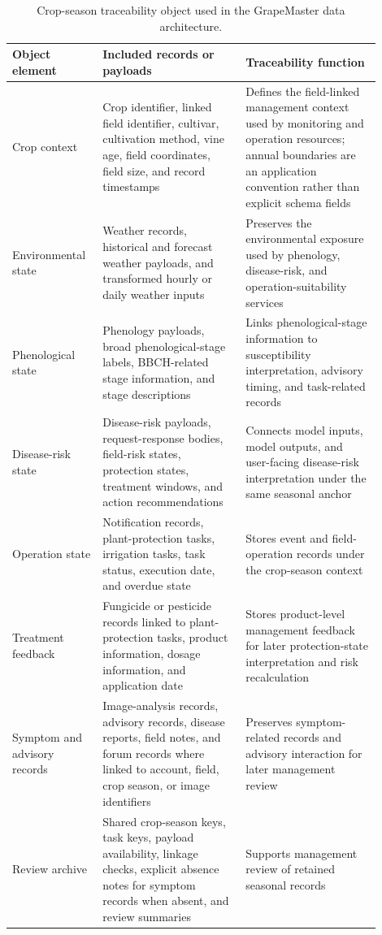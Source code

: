 \documentclass[12pt]{article}
\newcommand{\tablefontsize}{\fontsize{9pt}{11pt}\selectfont}
\begin{document}
\begin{table}[H]
\centering
\caption{Crop-season traceability object used in the GrapeMaster data architecture.}
\label{tab:traceability_object}
\tablefontsize
\begin{tabular}{@{}p{0.20\linewidth} p{0.36\linewidth} p{0.34\linewidth}@{}}
\toprule
Object element & Included records or payloads & Traceability function \\
\midrule
Crop context & Crop identifier, linked field identifier, cultivar, cultivation method, vine age, field coordinates, field size, and record timestamps & Defines the field-linked management context used by monitoring and operation resources; annual boundaries are an application convention rather than explicit schema fields \\
Environmental state & Weather records, historical and forecast weather payloads, and transformed hourly or daily weather inputs & Preserves the environmental exposure used by phenology, disease-risk, and operation-suitability services \\
Phenological state & Phenology payloads, broad phenological-stage labels, BBCH-related stage information, and stage descriptions & Links phenological-stage information to susceptibility interpretation, advisory timing, and task-related records \\
Disease-risk state & Disease-risk payloads, request-response bodies, field-risk states, protection states, treatment windows, and action recommendations & Connects model inputs, model outputs, and user-facing disease-risk interpretation under the same seasonal anchor \\
Operation state & Notification records, plant-protection tasks, irrigation tasks, task status, execution date, and overdue state & Stores event and field-operation records under the crop-season context \\
Treatment feedback & Fungicide or pesticide records linked to plant-protection tasks, product information, dosage information, and application date & Stores product-level management feedback for later protection-state interpretation and risk recalculation \\
Symptom and advisory records & Image-analysis records, advisory records, disease reports, field notes, and forum records where linked to account, field, crop season, or image identifiers & Preserves symptom-related records and advisory interaction for later management review \\
Review archive & Shared crop-season keys, task keys, payload availability, linkage checks, explicit absence notes for symptom records when absent, and review summaries & Supports management review of retained seasonal records \\
\bottomrule
\end{tabular}
\end{table}
\end{document}
